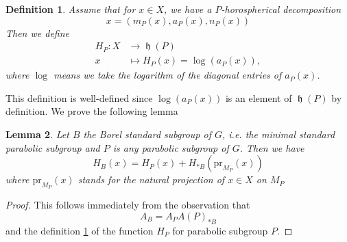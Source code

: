 \documentclass[12pt]{article} %
\newtheorem{definition}{Definition}[section]
\newtheorem{lemma}[definition]{Lemma}
\DeclareMathOperator{\fh}{\mathfrak{h}}
\begin{document}
\begin{definition}\label{H-function}
    Assume that for $x \in X$,
    we have a $P$-horospherical decomposition
    \[x = (m_P(x),a_P(x),n_P(x))\]
    Then we define
    \begin{align*}
        H_P \colon X & \to \fh(P)                     \\
        x            & \mapsto H_P(x) = \log(a_P(x)),
    \end{align*}
    where $\log$ means we  take the logarithm of the diagonal entries of $a_P(x)$.
\end{definition}
This definition is well-defined since $\log(a_P(x))$ is an element of $\fh(P)$ by definition.
We prove the following lemma
\begin{lemma}\label{H_P-decomp}
    Let $B$ the Borel standard subgroup of $G$, i.e. the minimal standard parabolic subgroup and $P$ is any parabolic subgroup of $G$.
    Then we have
    \[H_B(x) = H_P(x)+ H_{\ast B}(\text{pr}_{M_P}(x))\]
    where $\text{pr}_{M_P}(x)$ stands for the natural projection of $x \in X$ on $M_P$
\end{lemma}
\begin{proof}
This follows immediately from the observation that 
\[A_B = A_PA(P)_{\ast B}\]
and the definition \ref{H-function} of the function $H_P$ for parabolic subgroup $P$. 
\end{proof}
\end{document}
